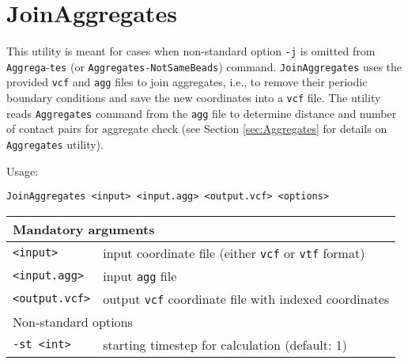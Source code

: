 \section{JoinAggregates} \label{sec:JoinAggregates}

This utility is meant for cases when non-standard option \texttt{-j} is
omitted from \texttt{Aggrega}-\texttt{tes} (or \texttt{Aggregates-NotSameBeads})
command. \texttt{JoinAggregates} uses the provided \texttt{vcf} and
\texttt{agg} files to join aggregates, i.e., to remove their periodic boundary
conditions and save the new coordinates into a \texttt{vcf} file. The
utility reads \texttt{Aggregates} command from the \texttt{agg} file to
determine distance and number of contact pairs for aggregate check (see
Section \ref{sec:Aggregates} for details on \texttt{Aggregates} utility).

Usage:

\vspace{1em}
\noindent
\texttt{JoinAggregates <input> <input.agg> <output.vcf> <options>}

\vspace{1em}
\noindent
\begin{longtable}{p{}p{}}
  \toprule
  \multicolumn{2}{l}{Mandatory arguments} \\
  \midrule
  \texttt{<input>} & input coordinate file (either \texttt{vcf} or
    \texttt{vtf} format) \\
  \texttt{<input.agg>} & input \texttt{agg} file \\
  \texttt{<output.vcf>} & output \texttt{vcf} coordinate file with indexed
    coordinates \\
  \toprule
  \multicolumn{2}{l}{Non-standard options} \\
  \midrule
  \texttt{-st <int>} & starting timestep for calculation (default: 1) \\
  \bottomrule
\end{longtable}
